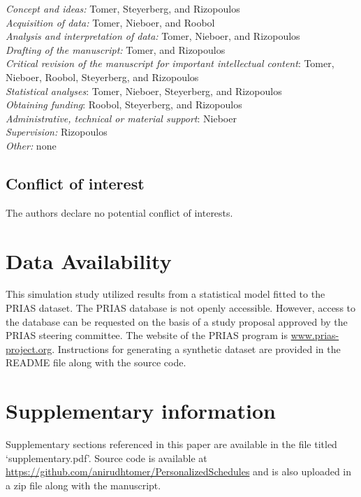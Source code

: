 \documentclass[AMA,STIX1COL]{WileyNJD-v2}
\begin{document}
\noindent\textit{Concept and ideas:} Tomer, Steyerberg, and Rizopoulos\\
\textit{Acquisition of data:} Tomer, Nieboer, and Roobol\\
\textit{Analysis and interpretation of data:} Tomer, Nieboer, and Rizopoulos\\
\textit{Drafting of the manuscript:} Tomer, and Rizopoulos\\
\textit{Critical revision of the manuscript for important intellectual content}: Tomer, Nieboer, Roobol, Steyerberg, and Rizopoulos\\
\textit{Statistical analyses}: Tomer, Nieboer, Steyerberg, and Rizopoulos\\
\textit{Obtaining funding}: Roobol, Steyerberg, and Rizopoulos\\
\textit{Administrative, technical or material support}: Nieboer\\
\textit{Supervision:} Rizopoulos\\
\textit{Other:} none

\subsection*{Conflict of interest}
The authors declare no potential conflict of interests.

\section*{Data Availability}
This simulation study utilized results from a statistical model fitted to the PRIAS dataset. The PRIAS database is not openly accessible. However, access to the database can be requested on the basis of a study proposal approved by the PRIAS steering committee. The website of the PRIAS program is \url{www.prias-project.org}. Instructions for generating a synthetic dataset are provided in the README file along with the source code.

\section*{Supplementary information}
Supplementary sections referenced in this paper are available in the file titled `supplementary.pdf'. Source code is available at \url{https://github.com/anirudhtomer/PersonalizedSchedules} and is also uploaded in a zip file along with the manuscript.

%
\end{document}
